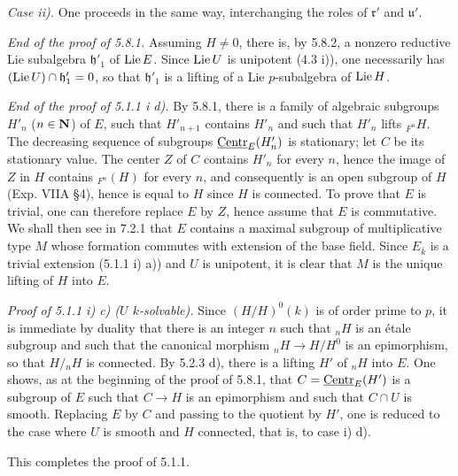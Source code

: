 \noindent\emph{Case ii).} One proceeds in the same way, interchanging the roles of $\mathfrak r'$ and $\mathfrak u'$.

\noindent\emph{End of the proof of 5.8.1.} Assuming $H\ne0$, there is, by 5.8.2, a nonzero reductive Lie subalgebra $\mathfrak h'_1$ of $\operatorname{Lie} E$. Since $\operatorname{Lie} U$ is unipotent (4.3 i)), one necessarily has $(\operatorname{Lie} U)\cap\mathfrak h'_1=0$, so that $\mathfrak h'_1$ is a lifting of a Lie $p$-subalgebra of $\operatorname{Lie} H$.

\noindent\emph{End of the proof of 5.1.1 i d).} By 5.8.1, there is a family of algebraic subgroups $H'_n$ ($n\in\mathbf{N}$) of $E$, such that $H'_{n+1}$ contains $H'_n$ and such that $H'_n$ lifts ${}_{F^n}H$. The decreasing sequence of subgroups $\underline{\mathrm{Centr}}_E(H'_n)$ is stationary; let $C$ be its stationary value. The center $Z$ of $C$ contains $H'_n$ for every $n$, hence the image of $Z$ in $H$ contains ${}_{F^n}(H)$ for every $n$, and consequently is an open subgroup of $H$ (Exp. VIIA \S4), hence is equal to $H$ since $H$ is connected. To prove that $E$ is trivial, one can therefore replace $E$ by $Z$, hence assume that $E$ is commutative. We shall then see in 7.2.1 that $E$ contains a maximal subgroup of multiplicative type $M$ whose formation commutes with extension of the base field. Since $E_{\bar k}$ is a trivial extension (5.1.1 i) a)) and $U$ is unipotent, it is clear that $M$ is the unique lifting of $H$ into $E$.

\noindent\emph{Proof of 5.1.1 i) c) ($U$ $k$-solvable).} Since $(H/H)^0(k)$ is of order prime to $p$, it is immediate by duality that there is an integer $n$ such that ${}_nH$ is an étale subgroup and such that the canonical morphism ${}_nH\to H/H^0$ is an epimorphism, so that $H/{}_nH$ is connected. By 5.2.3 d), there is a lifting $H'$ of ${}_nH$ into $E$. One shows, as at the beginning of the proof of 5.8.1, that $C=\underline{\mathrm{Centr}}_E(H')$ is a subgroup of $E$ such that $C\to H$ is an epimorphism and such that $C\cap U$ is smooth. Replacing $E$ by $C$ and passing to the quotient by $H'$, one is reduced to the case where $U$ is smooth and $H$ connected, that is, to case i) d).

This completes the proof of 5.1.1.

